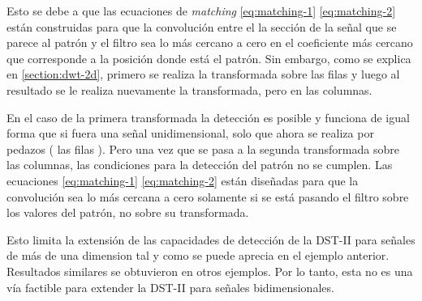 Esto se debe a que las ecuaciones de \textit{matching} \ref{eq:matching-1} \ref{eq:matching-2} están 
construidas para que la convolución entre el la sección de la señal que se parece al patrón y 
el filtro sea lo más cercano a cero en el coeficiente más cercano que corresponde a la posición donde está el patrón.
Sin embargo, como se explica en \ref{section:dwt-2d}, primero se realiza la transformada sobre las filas y luego al resultado
se le realiza nuevamente la transformada, pero en las columnas. 

En el caso de la primera transformada la detección es posible y funciona de igual forma que si fuera una señal
unidimensional, solo que ahora se realiza por pedazos ( las filas ). 
Pero una vez que se pasa a la segunda transformada sobre las columnas, las condiciones para la detección del patrón no se cumplen.
Las ecuaciones \ref{eq:matching-1} \ref{eq:matching-2} están diseñadas para que la convolución sea lo más cercana a cero
solamente si se está pasando el filtro sobre los valores del patrón, no sobre su transformada.

Esto limita la extensión de las capacidades de detección de la DST-II para señales de más de una dimension tal y como se puede
aprecia en el ejemplo anterior. Resultados similares se obtuvieron en otros ejemplos. Por lo tanto, esta no es una 
vía factible para extender la DST-II para señales bidimensionales.


